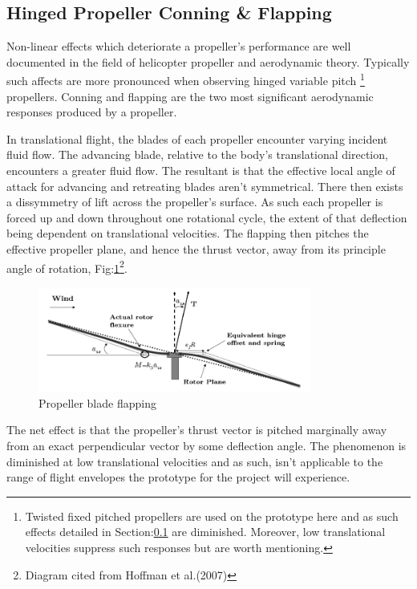 \subsection{Hinged Propeller Conning \& Flapping}
\label{subsec:dynamics.aero.flap}
Non-linear effects which deteriorate a propeller's performance are well documented in the field of helicopter propeller and aerodynamic theory. Typically such affects are more pronounced when observing hinged variable pitch \footnote{Twisted fixed pitched propellers are used on the prototype here and as such effects detailed in Section:\ref{subsec:dynamics.aero.flap} are diminished. Moreover, low translational velocities suppress such responses but are worth mentioning.} propellers. Conning and flapping are the two most significant aerodynamic responses produced by a propeller.
\par
In translational flight, the blades of each propeller encounter varying incident fluid flow. The advancing blade, relative to the body's translational direction, encounters a greater fluid flow. The resultant is that the effective local angle of attack for advancing and retreating blades aren't symmetrical. There then exists a dissymmetry of lift across the propeller's surface. As such each propeller is forced up and down throughout one rotational cycle, the extent of that deflection being dependent on translational velocities. The flapping then pitches the effective propeller plane, and hence the thrust vector, away from its principle angle of rotation, Fig:\ref{fig:prop-flap}\footnote{Diagram cited from Hoffman et al.(2007)\cite{starmac}}.
\begin{figure}[htbp]
\centering
\includegraphics[width=0.8\textwidth]{figs/prop-flap}
\caption{Propeller blade flapping}
\label{fig:prop-flap}
\end{figure}
\par
The net effect is that the propeller's thrust vector is pitched marginally away from an exact perpendicular vector by some deflection angle. The phenomenon is diminished at low translational velocities and as such, isn't applicable to the range of flight envelopes the prototype for the project will experience.
